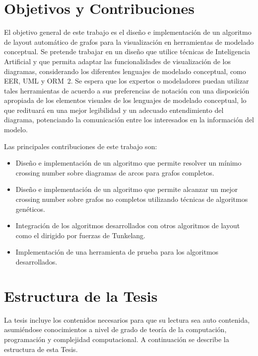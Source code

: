 \section{Objetivos y Contribuciones}
El objetivo general de este trabajo es el diseño e implementación  de un algoritmo de layout automático de grafos para la visualización en herramientas de modelado conceptual. Se pretende trabajar en un diseño que utilice técnicas de Inteligencia Artificial y que  permita adaptar las funcionalidades de visualización de los diagramas, considerando los diferentes lenguajes de modelado conceptual, como EER, UML y \mbox{ORM 2.}
Se espera que los expertos o modeladores puedan utilizar tales herramientas de acuerdo a sus preferencias de notación con una disposición apropiada de los elementos visuales de los lenguajes de modelado conceptual, lo que redituará en una mejor legibilidad y un adecuado entendimiento del diagrama, potenciando la comunicación entre los interesados en la información del modelo.

Las principales contribuciones de este trabajo son:

\begin{itemize}
\item Diseño e implementación de un algoritmo que permite resolver un mínimo crossing number sobre diagramas de arcos para grafos completos.

\item Diseño e implementación de un algoritmo que permite alcanzar un mejor crossing number sobre  grafos no completos utilizando técnicas de algoritmos genéticos.

\item Integración de los algoritmos desarrollados con otros algoritmos de layout como el dirigido por fuerzas de Tunkelang.

\item Implementación de una herramienta de prueba para los algoritmos desarrollados.

\end{itemize}

\section{Estructura de la Tesis}
La tesis incluye los contenidos necesarios para que su lectura sea auto contenida, asumiéndose conocimientos a nivel de grado de teoría de la computación, programación y complejidad computacional. A continuación se describe la estructura de esta Tesis.

